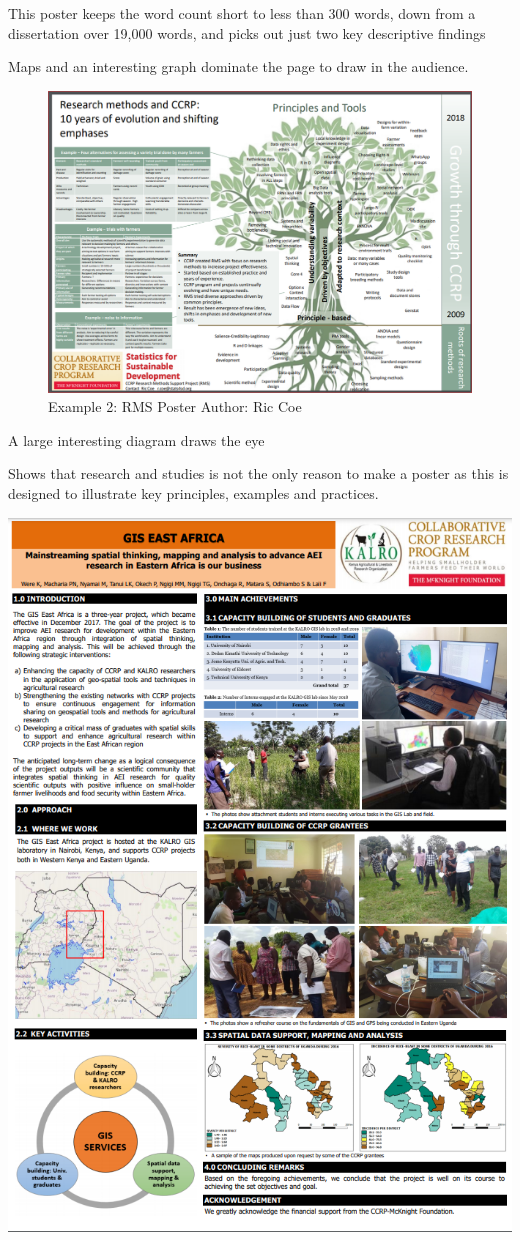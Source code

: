 \documentclass[
  titlepage]{book}
\begin{document}
This poster keeps the word count short to less than 300 words, down from a dissertation over 19,000 words, and picks out just two key descriptive findings

Maps and an interesting graph dominate the page to draw in the audience.

\begin{figure}
\centering
\includegraphics{img/CCRP poster 1.png}
\caption{Example 2: RMS Poster Author: Ric Coe}
\end{figure}

A large interesting diagram draws the eye

Shows that research and studies is not the only reason to make a poster as this is designed to illustrate key principles, examples and practices.

\begin{center}\includegraphics[width=0.75\linewidth,height=0.5\textheight]{img/GIS East Africa Poster} \end{center}
\end{document}

